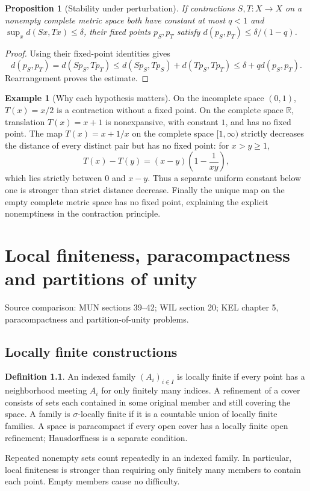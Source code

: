 \documentclass[11pt,oneside,openany]{book}
\newtheorem{proposition}[theorem]{Proposition}
\theoremstyle{definition}
\newtheorem{definition}[theorem]{Definition}
\newtheorem{example}[theorem]{Example}
\theoremstyle{remark}
\newcommand{\R}{\mathbb R}\newcommand{\C}{\mathbb C}
\newcommand{\source}[1]{\par\begingroup\small\sffamily\color{black!65}Source comparison: #1\par\endgroup}
\begin{document}
\begin{proposition}[Stability under perturbation]\label{d10:14:fixed-point-stability}
If contractions $S,T:X\to X$ on a nonempty complete metric space both have constant at most $q<1$ and $\sup_xd(Sx,Tx)\leq\delta$, their fixed points $p_S,p_T$ satisfy $d(p_S,p_T)\leq\delta/(1-q)$.
\end{proposition}
\begin{proof}
Using their fixed-point identities gives
\[
 d(p_S,p_T)=d(Sp_S,Tp_T)
 \leq d(Sp_S,Tp_S)+d(Tp_S,Tp_T)
 \leq\delta+qd(p_S,p_T).
\]
Rearrangement proves the estimate.
\end{proof}

\begin{example}[Why each hypothesis matters]\label{d10:14:contraction-boundaries}
On the incomplete space $(0,1)$, $T(x)=x/2$ is a contraction without a fixed point. On the complete space $\R$, translation $T(x)=x+1$ is nonexpansive, with constant $1$, and has no fixed point. The map $T(x)=x+1/x$ on the complete space $[1,\infty)$ strictly decreases the distance of every distinct pair but has no fixed point: for $x>y\geq1$,
\[
 T(x)-T(y)=(x-y)\left(1-\frac1{xy}\right),
\]
which lies strictly between $0$ and $x-y$. Thus a separate uniform constant below one is stronger than strict distance decrease. Finally the unique map on the empty complete metric space has no fixed point, explaining the explicit nonemptiness in the contraction principle.
\end{example}



\chapter{Local finiteness, paracompactness and partitions of unity}
\label{ch:d10-15}
\source{MUN sections 39--42; WIL section 20; KEL chapter 5, paracompactness and partition-of-unity problems.}

\section{Locally finite constructions}
\begin{definition}\label{d10:15:locally-finite}
An indexed family $(A_i)_{i\in I}$ is locally finite if every point has a
neighborhood meeting $A_i$ for only finitely many indices. A refinement of a
cover consists of sets each contained in some original member and still
covering the space. A family is $\sigma$-locally finite if it is a countable
union of locally finite families. A space is paracompact if every open cover
has a locally finite open refinement; Hausdorffness is a separate condition.
\end{definition}
Repeated nonempty sets count repeatedly in an indexed family. In particular,
local finiteness is stronger than requiring only finitely many members to
contain each point. Empty members cause no difficulty.
\end{document}
